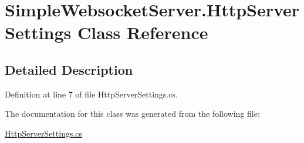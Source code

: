 \hypertarget{class_simple_websocket_server_1_1_http_server_settings}{}\section{Simple\+Websocket\+Server.\+Http\+Server\+Settings Class Reference}
\label{class_simple_websocket_server_1_1_http_server_settings}


\subsection{Detailed Description}


Definition at line 7 of file Http\+Server\+Settings.\+cs.



The documentation for this class was generated from the following file\+:\begin{DoxyCompactItemize}
\item 
\mbox{\hyperlink{_http_server_settings_8cs}{Http\+Server\+Settings.\+cs}}\end{DoxyCompactItemize}
